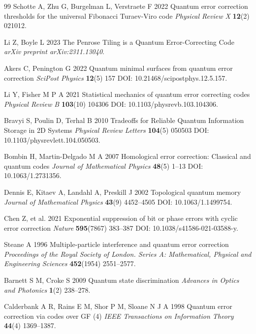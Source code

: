 \documentclass{iopjournal}
\theoremstyle{thmstyleone}%
\theoremstyle{thmstyletwo}%
\theoremstyle{thmstylethree}%
\begin{document}
\begin{thebibliography}{99}
Schotte A, Zhu G, Burgelman L, Verstraete F 2022 Quantum error correction thresholds for the universal Fibonacci Turaev-Viro code \emph{Physical Review X} \textbf{12}(2) 021012.

Li Z, Boyle L 2023 The Penrose Tiling is a Quantum Error-Correcting Code \emph{arXiv preprint arXiv:2311.13040}.

Akers C, Penington G 2022 Quantum minimal surfaces from quantum error correction \emph{SciPost Physics} \textbf{12}(5) 157 DOI: 10.21468/scipostphys.12.5.157.



Li Y, Fisher M P A 2021 Statistical mechanics of quantum error correcting codes \emph{Physical Review B} \textbf{103}(10) 104306 DOI: 10.1103/physrevb.103.104306.

Bravyi S, Poulin D, Terhal B 2010 Tradeoffs for Reliable Quantum Information Storage in 2D Systems \emph{Physical Review Letters} \textbf{104}(5) 050503 DOI: 10.1103/physrevlett.104.050503.

Bombin H, Martin-Delgado M A 2007 Homological error correction: Classical and quantum codes \emph{Journal of Mathematical Physics} \textbf{48}(5) 1–13 DOI: 10.1063/1.2731356.

Dennis E, Kitaev A, Landahl A, Preskill J 2002 Topological quantum memory \emph{Journal of Mathematical Physics} \textbf{43}(9) 4452–4505 DOI: 10.1063/1.1499754.

Chen Z, et al. 2021 Exponential suppression of bit or phase errors with cyclic error correction \emph{Nature} \textbf{595}(7867) 383–387 DOI: 10.1038/s41586-021-03588-y.


Steane A 1996 Multiple-particle interference and quantum error correction \emph{Proceedings of the Royal Society of London. Series A: Mathematical, Physical and Engineering Sciences} \textbf{452}(1954) 2551–2577.


Barnett S M, Croke S 2009 Quantum state discrimination \emph{Advances in Optics and Photonics} \textbf{1}(2) 238–278.

Calderbank A R, Rains E M, Shor P M, Sloane N J A 1998 Quantum error correction via codes over GF (4) \emph{IEEE Transactions on Information Theory} \textbf{44}(4) 1369–1387.


\end{thebibliography}
\end{document}
